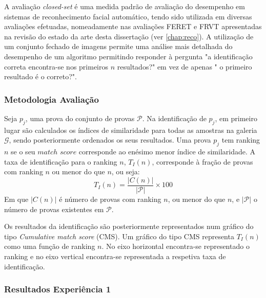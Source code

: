A avaliação \textit{closed-set} é uma medida padrão de avaliação do desempenho em sistemas de reconhecimento facial automático, tendo sido utilizada em diversas avaliações efetuadas, nomeadamente nas avaliações FERET e FRVT apresentadas na revisão do estado da arte desta dissertação (ver \ref{chap:reco}). A utilização de um conjunto fechado de imagens permite uma análise mais detalhada do desempenho de um algoritmo permitindo responder à pergunta "a identificação correta encontra-se nos primeiros $n$ resultados?" em vez de apenas " o primeiro resultado é o correto?".

\subsubsection{Metodologia Avaliação}
Seja $p_j$, uma prova do conjunto de provas $\mathscr{P}$. Na identificação de $p_j$, em primeiro lugar são calculados os índices de similaridade para todas as amostras na galeria $\mathscr{G}$, sendo posteriormente ordenados os seus resultados. Uma prova $p_j$ tem ranking $n$ se o seu $match$ $score$ corresponde ao enésimo menor índice de similaridade. A taxa de identificação para o ranking $n$, $T_{I}(n)$, corresponde à fração de provas com ranking $n$ ou menor do que $n$, ou seja:
\begin{equation}
T_{I}(n) = \frac{|C(n)|}{|\mathscr{P}|} \times 100
\end{equation}
Em que $|C(n)|$ é número de provas com ranking $n$, ou menor do que $n$, e $|\mathscr{P}|$ o número de provas existentes em $\mathscr{P}$.
 
Os resultados da identificação são posteriormente representados num gráfico do tipo \textit{Cumulative match score} (CMS). Um gráfico do tipo CMS representa $T_{I}(n)$ como uma função de ranking $n$. No eixo horizontal encontra-se representado o ranking e no eixo vertical encontra-se representada a respetiva taxa de identificação.

\subsubsection{Resultados Experiência 1}

